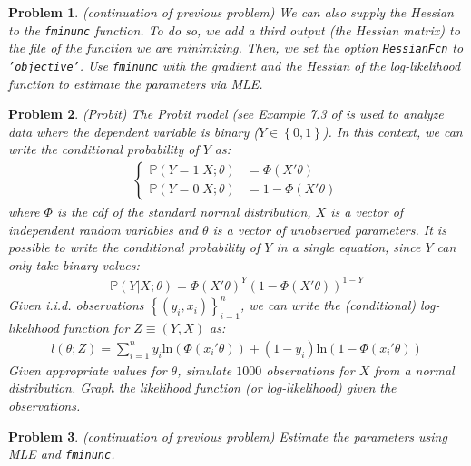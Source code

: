 \documentclass[12pt, a4paper]{article}
\newcommand{\Set}[1]{\left\{#1\right\}}
\renewcommand{\ln}[1]{\text{ln}\left(#1\right)}
\newtheorem{problem}{Problem}
\begin{document}
\begin{problem}
(continuation of previous problem)
We can also supply the Hessian to the \texttt{fminunc} function.
To do so, we add a third output (the Hessian matrix) to the file of the function we are minimizing.
Then, we set the option \texttt{HessianFcn} to \texttt{'objective'}.
Use \texttt{fminunc} with the gradient and the Hessian of the log-likelihood function to estimate the parameters via MLE.
\end{problem}

\begin{problem}
(Probit)
The Probit model (see Example 7.3 of \citet{H2000} is used to analyze data where the dependent variable is binary (\(Y\in\Set{0, 1}\)).
In this context, we can write the conditional probability of \(Y\) as:
\begin{align*}
  \begin{cases}
    \mathbb{P}(Y=1\vert X; \theta) &= \Phi(X'\theta)\\
    \mathbb{P}(Y=0\vert X; \theta) &= 1 - \Phi(X'\theta)
  \end{cases}
\end{align*}
where \(\Phi\) is the cdf of the standard normal distribution, \(X\) is a vector of independent random variables and \(\theta\) is a vector of unobserved parameters.
It is possible to write the conditional probability of \(Y\) in a single equation, since \(Y\) can only take binary values:
\begin{align*}
\mathbb{P}(Y\vert X;\theta)={\Phi(X'\theta)}^Y(1-\Phi(X'\theta))^{1-Y}
\end{align*}
Given i.i.d. observations \(\Set{(y_i, x_i)}_{i=1}^n\), we can write the (conditional) log-likelihood function for \(Z\equiv(Y,X)\) as:
\begin{align*}
l(\theta; Z)=\sum_{i=1}^n y_i\ln{\Phi(x_i'\theta)} + (1-y_i)\ln{1-\Phi(x_i'\theta)}
\end{align*}
Given appropriate values for \(\theta\), simulate \(1000\) observations for \(X\) from a normal distribution.
Graph the likelihood function (or log-likelihood) given the observations.
\end{problem}

\begin{problem}
(continuation of previous problem)
Estimate the parameters using MLE and \texttt{fminunc}.
\end{problem}
\end{document}
